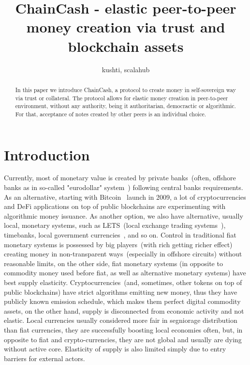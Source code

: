 \documentclass{article}   %
\begin{document}
\title{ChainCash - elastic peer-to-peer money creation via trust and blockchain assets}
\author{kushti, scalahub}


\maketitle

\begin{abstract}
In this paper we introduce ChainCash, a protocol to create money in self-sovereign way via trust or collateral. The
protocol allows for elastic money creation in peer-to-peer environment, without any authority, being it authoritarian,
democractic or algorithmic. For that, acceptance of notes created by other peers is an individual choice.
\end{abstract}


\section{Introduction}

Currently, most of monetary value is created by private banks~(often, offshore banks as in so-called "eurodollar" system~\cite{machlup1970euro}) following central banks requirements. As an alternative, starting with Bitcoin~\cite{nakamoto2008peer} launch in 2009, a lot of cryptocurrencies 
and DeFi applications on top of public blockchains are experimenting with algorithmic money issuance. As another option, we also have alternative, usually local, monetary systems, such as LETS~(local exchange trading systems~\cite{williams1996new}), timebanks, local government currencies~\cite{unterguggenbercer1934end}, and so on. Control in traditional fiat monetary systems is possessed by big players~(with rich getting richer effect) creating money in non-transparent ways~(especially in offshore circuits) without reasonable limits, on the other side, fiat monetary systems (in opposite to commodity money used before fiat, as well as alternative monetary systems) have best supply elasticity. Cryptocurrencies~(and, sometimes, other tokens on top of public blockchains) have strict algorithms emitting new money, thus they have publicly known emission schedule, which makes them perfect digital commodity assets, on the other hand, supply is disconnected from economic activity and not elastic. Local currencies usually considered more fair in segniorage distribution than fiat currencies, they are successfully boosting local economies often, but, in opposite to fiat and crypto-currencies, they are not global and
 usually are dying without active core. Elasticity of supply is also limited simply due to entry barriers for external actors.
\end{document}
